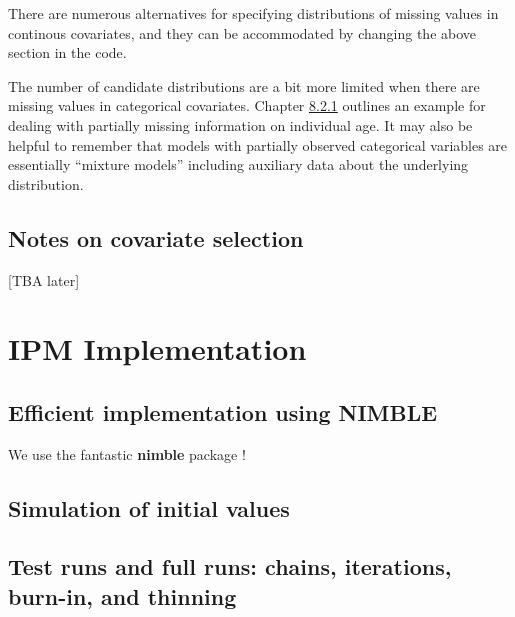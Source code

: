 \documentclass[
]{book}
\begin{document}
There are numerous alternatives for specifying distributions of missing values
in continous covariates, and they can be accommodated by changing the above
section in the code.

The number of candidate distributions are a bit more limited when there are
missing values in categorical covariates.
Chapter \protect\hyperlink{ux5cux23ux5cux23ux5cux2520Includingux5cux2520partiallyux5cux2520observedux5cux2520ageux5cux2520information}{8.2.1} outlines an
example for dealing with partially missing information on individual age. It
may also be helpful to remember that models with partially observed categorical
variables are essentially ``mixture models'' including auxiliary data about the
underlying distribution.

\hypertarget{notes-on-covariate-selection}{%
\section{Notes on covariate selection}\label{notes-on-covariate-selection}}

{[}TBA later{]}

\hypertarget{IPMImp}{%
\chapter{IPM Implementation}\label{IPMImp}}

\hypertarget{efficient-implementation-using-nimble}{%
\section{Efficient implementation using NIMBLE}\label{efficient-implementation-using-nimble}}

We use the fantastic \textbf{nimble} package \citep{devalpine2017}!

\hypertarget{simulation-of-initial-values}{%
\section{Simulation of initial values}\label{simulation-of-initial-values}}

\hypertarget{test-runs-and-full-runs-chains-iterations-burn-in-and-thinning}{%
\section{Test runs and full runs: chains, iterations, burn-in, and thinning}\label{test-runs-and-full-runs-chains-iterations-burn-in-and-thinning}}
\end{document}
